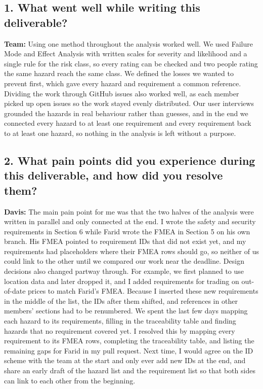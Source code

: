 \documentclass{article}
\begin{document}



\subsection*{1. What went well while writing this deliverable?}

\textbf{Team:} Using one method throughout the analysis worked well. We
    used Failure Mode and Effect Analysis with written scales for severity and
    likelihood and a single rule for the risk class, so every rating can be
    checked and two people rating the same hazard reach the same class. We
    defined the losses we wanted to prevent first, which gave every hazard and
    requirement a common reference. Dividing the work through GitHub issues
    also worked well, as each member picked up open issues so the work stayed
    evenly distributed. Our user interviews grounded the hazards in real
    behaviour rather than guesses, and in the end we connected every hazard to
    at least one requirement and every requirement back to at least one
    hazard, so nothing in the analysis is left without a purpose.

\subsection*{2. What pain points did you experience during this deliverable, and
how did you resolve them?}

\textbf{Davis:} The main pain point for me was that the two halves of the
analysis were written in parallel and only connected at the end. I wrote the
safety and security requirements in Section 6 while Farid wrote the FMEA in
Section 5 on his own branch. His FMEA pointed to requirement IDs that did not
exist yet, and my requirements had placeholders where their FMEA rows should
go, so neither of us could link to the other until we compared our work near
the deadline. Design decisions also changed partway through. For example, we
first planned to use location data and later dropped it, and I added
requirements for trading on out-of-date prices to match Farid's FMEA. Because I
inserted these new requirements in the middle of the list, the IDs after them
shifted, and references in other members' sections had to be renumbered. We
spent the last few days mapping each hazard to its requirements, filling in the
traceability table and finding hazards that no requirement covered yet. I resolved this by mapping every requirement
to its FMEA rows, completing the traceability table, and listing the remaining
gaps for Farid in my pull request. Next time, I would agree on the ID scheme
with the team at the start and only ever add new IDs at the end, and share an
early draft of the hazard list and the requirement list so that both sides can
link to each other from the beginning.\\
\end{document}
